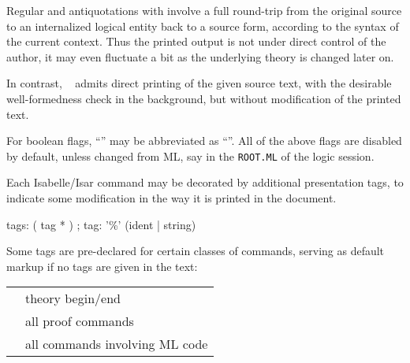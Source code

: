 \begin{isabellebody}
\begin{isamarkuptext}
\begin{description}
  Regular  and  antiquotations with  involve a full round-trip from the original source
  to an internalized logical entity back to a source form, according
  to the syntax of the current context.  Thus the printed output is
  not under direct control of the author, it may even fluctuate a bit
  as the underlying theory is changed later on.

  In contrast, \hypertarget{antiquotation option.source}{\hyperlink{antiquotation option.source}{\mbox{}}}~
  admits direct printing of the given source text, with the desirable
  well-formedness check in the background, but without modification of
  the printed text.

  \end{description}

  For boolean flags, ``'' may be abbreviated as
  ``''.  All of the above flags are disabled by default,
  unless changed from ML, say in the \verb|ROOT.ML| of the
  logic session.%
\end{isamarkuptext}%
\isamarkuptrue%
%
\isamarkuptrue%
%
\begin{isamarkuptext}%
Each Isabelle/Isar command may be decorated by additional
  presentation tags, to indicate some modification in the way it is
  printed in the document.

  \begin{rail}
    tags: ( tag * )
    ;
    tag: '\%' (ident | string)
  \end{rail}

  Some tags are pre-declared for certain classes of commands, serving
  as default markup if no tags are given in the text:

  \medskip
  \begin{tabular}{ll}
    \isa{{\isachardoublequote}theory{\isachardoublequote}} & theory begin/end \\
    \isa{{\isachardoublequote}proof{\isachardoublequote}} & all proof commands \\
    \isa{{\isachardoublequote}ML{\isachardoublequote}} & all commands involving ML code \\
  \end{tabular}


\end{isamarkuptext}
\end{isabellebody}
